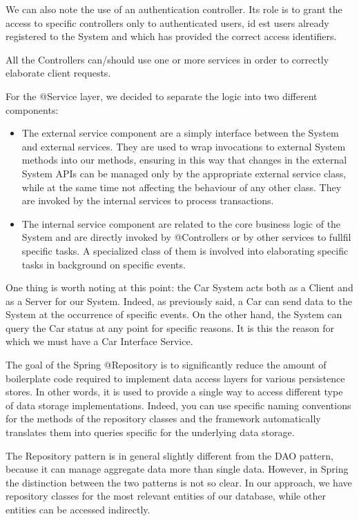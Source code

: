 \documentclass[12pt]{article}
\begin{document}
We can also note the use of an authentication controller. Its role is to grant the access to specific controllers only to authenticated users, id est users already registered to the System and which has provided the correct access identifiers.

All the Controllers can/should use one or more services in order to correctly elaborate client requests.

\bigskip

For the @Service layer, we decided to separate the logic into two different components:
\begin{itemize}
\item The external service component are a simply interface between the System and external services. They are used to wrap invocations to external System methods into our methods, ensuring in this way that changes in the external System APIs can be managed only by the appropriate external service class, while at the same time not affecting the behaviour of any other class. They are invoked by the internal services to process transactions.
\item The internal service component are related to the core business logic of the System and are directly invoked by @Controllers or by other services to fullfil specific tasks. A specialized class of them is involved into elaborating specific tasks in background on specific events. 
\end{itemize}

One thing is worth noting at this point: the Car System acts both as a Client and as a Server for our System. Indeed, as previously said, a Car can send data to the System at the occurrence of specific events. On the other hand, the System can query the Car status at any point for specific reasons. It is this the reason for which we must have a Car Interface Service.

\bigskip
The goal of the Spring @Repository is to significantly reduce the amount of boilerplate code required to implement data access layers for various persistence stores. In other words, it is used to provide a single way to access different type of data storage implementations. Indeed, you can use specific naming conventions for the methods of the repository classes and the framework automatically translates them into queries specific for the underlying data storage.

The Repository pattern is in general slightly different from the DAO pattern, because it can manage aggregate data more than single data. However, in Spring the distinction between the two patterns is not so clear.
In our approach, we have repository classes for the most relevant entities of our database, while other entities can be accessed indirectly.
\end{document}
